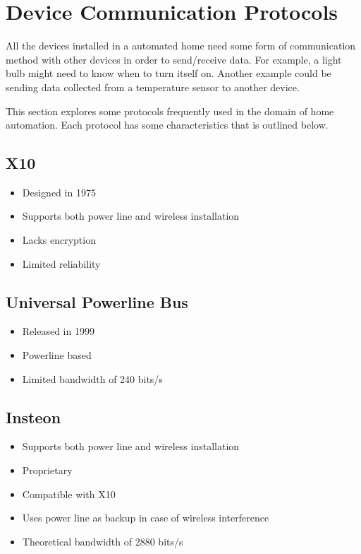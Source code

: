 \section{Device Communication Protocols}

All the devices installed in a automated home need some form of communication
method with other devices in order to send/receive data. For example, a light
bulb might need to know when to turn itself on. Another example could be
sending data collected from a temperature sensor to another device.

This section explores some protocols frequently used in the domain of home
automation. Each protocol has some characteristics that is outlined below.

\subsection{X10} \cite{wiki_x10}

\begin{itemize}
\item Designed in 1975
\item Supports both power line and wireless installation
\item Lacks encryption
\item Limited reliability
\end{itemize}


\subsection{Universal Powerline Bus} \cite{wiki_upb}

\begin{itemize}
\item Released in 1999
\item Powerline based
\item Limited bandwidth of 240 bits/s
\end{itemize}


\subsection{Insteon} \cite{wiki_insteon}

\begin{itemize}
\item Supports both power line and wireless installation
\item Proprietary
\item Compatible with X10
\item Uses power line as backup in case of wireless interference
\item Theoretical bandwidth of 2880 bits/s
\end{itemize}


